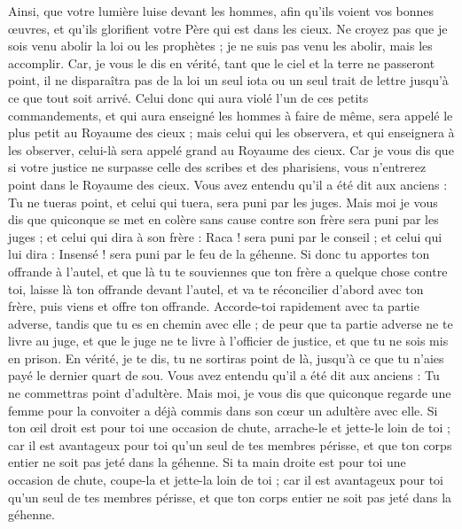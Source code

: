 \begin{multicols}{2}
Ainsi, que votre lumière luise devant les hommes, afin qu'ils voient vos bonnes œuvres, et qu'ils glorifient votre Père qui est dans les cieux.
Ne croyez pas que je sois venu abolir la loi ou les prophètes ; je ne suis pas venu les abolir, mais les accomplir.
Car, je vous le dis en vérité, tant que le ciel et la terre ne passeront point, il ne disparaîtra pas de la loi un seul iota ou un seul trait de lettre jusqu’à ce que tout soit arrivé.
Celui donc qui aura violé l'un de ces petits commandements, et qui aura enseigné les hommes à faire de même, sera appelé le plus petit au Royaume des cieux ; mais celui qui les observera, et qui enseignera à les observer, celui-là sera appelé grand au Royaume des cieux.
Car je vous dis que si votre justice ne surpasse celle des scribes et des pharisiens, vous n'entrerez point dans le Royaume des cieux.
Vous avez entendu qu'il a été dit aux anciens : Tu ne tueras point, et celui qui tuera, sera puni par les juges.
Mais moi je vous dis que quiconque se met en colère sans cause contre son frère sera puni par les juges ; et celui qui dira à son frère : Raca ! sera puni par le conseil ; et celui qui lui dira : Insensé ! sera puni par le feu de la géhenne.
Si donc tu apportes ton offrande à l'autel, et que là tu te souviennes que ton frère a quelque chose contre toi,
laisse là ton offrande devant l'autel, et va te réconcilier d’abord avec ton frère, puis viens et offre ton offrande.
Accorde-toi rapidement avec ta partie adverse, tandis que tu es en chemin avec elle ; de peur que ta partie adverse ne te livre au juge, et que le juge ne te livre à l’officier de justice, et que tu ne sois mis en prison.
En vérité, je te dis, tu ne sortiras point de là, jusqu'à ce que tu n’aies payé le dernier quart de sou.
Vous avez entendu qu'il a été dit aux anciens : Tu ne commettras point d’adultère.
Mais moi, je vous dis que quiconque regarde une femme pour la convoiter a déjà commis dans son cœur un adultère avec elle.
Si ton œil droit est pour toi une occasion de chute, arrache-le et jette-le loin de toi ; car il est avantageux pour toi qu'un seul de tes membres périsse, et que ton corps entier ne soit pas jeté dans la géhenne.
Si ta main droite est pour toi une occasion de chute, coupe-la et jette-la loin de toi ; car il est avantageux pour toi qu’un seul de tes membres périsse, et que ton corps entier ne soit pas jeté dans la géhenne.

\end{multicols}
